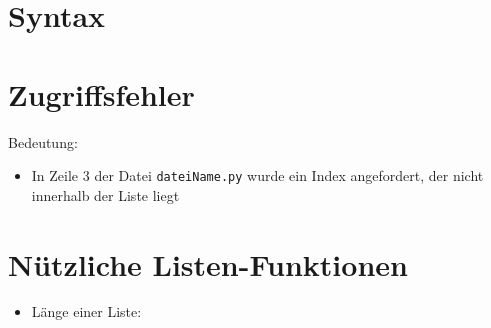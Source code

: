 \section{Syntax}
\begin{frame}
    \slidehead
\end{frame}

\section{Zugriffsfehler}
\begin{frame}
    \slidehead
    Bedeutung:
    \begin{itemize}
        \item In Zeile 3 der Datei \texttt{dateiName.py} wurde ein Index angefordert, der nicht innerhalb der Liste liegt
    \end{itemize}

\end{frame}


%
\subtitle{Listen}
\subtitle{Kapitel 5: ganz viele variablen in einer}

\section{Nützliche Listen-Funktionen}
\begin{frame}
    \slidehead
    \begin{itemize}
        \item Länge einer Liste:
    \end{itemize}
\end{frame}

